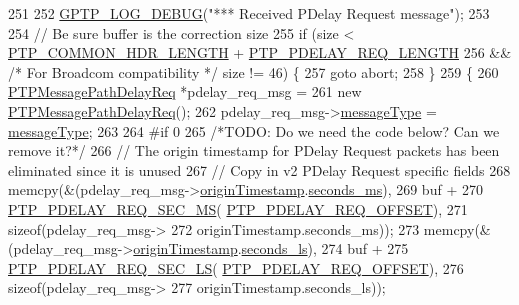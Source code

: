 \begin{DoxyCode}
{{{{{{251 
252         \hyperlink{gptp__log_8hpp_ae4c6efe7c9cf6d7d3bbd28a0fd087d61}{GPTP\_LOG\_DEBUG}(\textcolor{stringliteral}{"*** Received PDelay Request message"});
253 
254         \textcolor{comment}{// Be sure buffer is the correction size}
255         \textcolor{keywordflow}{if} (size < \hyperlink{avbts__message_8hpp_a8ec4d965b7b1e83844f1c17f12e9b8e4}{PTP\_COMMON\_HDR\_LENGTH} + 
      \hyperlink{avbts__message_8hpp_a7116d339377bcb1fbb2f4276aa9b3f70}{PTP\_PDELAY\_REQ\_LENGTH}
256             && \textcolor{comment}{/* For Broadcom compatibility */} size != 46) \{
257             \textcolor{keywordflow}{goto} abort;
258         \}
259         \{
260             \hyperlink{class_p_t_p_message_path_delay_req}{PTPMessagePathDelayReq} *pdelay\_req\_msg =
261                 \textcolor{keyword}{new} \hyperlink{class_p_t_p_message_path_delay_req}{PTPMessagePathDelayReq}();
262             pdelay\_req\_msg->\hyperlink{class_p_t_p_message_common_adb32627aa5b0e2dbad3ccd88aab07c05}{messageType} = \hyperlink{class_p_t_p_message_common_adb32627aa5b0e2dbad3ccd88aab07c05}{messageType};
263 
264 \textcolor{preprocessor}{#if 0}
265             \textcolor{comment}{/*TODO: Do we need the code below? Can we remove it?*/}
266             \textcolor{comment}{// The origin timestamp for PDelay Request packets has been eliminated since it is unused}
267             \textcolor{comment}{// Copy in v2 PDelay Request specific fields}
268             memcpy(&(pdelay\_req\_msg->\hyperlink{class_p_t_p_message_path_delay_req_a57a4bfcce938833de582c2ed5138aa3b}{originTimestamp}.\hyperlink{class_timestamp_a5d98378d782519e6f9c17db70f1620f0}{seconds\_ms}),
269                    buf +
270                    \hyperlink{avbts__message_8hpp_a6bca65c57b0e9a4c479d03f73fd91c02}{PTP\_PDELAY\_REQ\_SEC\_MS}(
      \hyperlink{avbts__message_8hpp_a11afdce162945d7ec2f0083eecbd53bd}{PTP\_PDELAY\_REQ\_OFFSET}),
271                    \textcolor{keyword}{sizeof}(pdelay\_req\_msg->
272                       originTimestamp.seconds\_ms));
273             memcpy(&(pdelay\_req\_msg->\hyperlink{class_p_t_p_message_path_delay_req_a57a4bfcce938833de582c2ed5138aa3b}{originTimestamp}.\hyperlink{class_timestamp_a2bf200e58cd268d8b86cf93c51500a44}{seconds\_ls}),
274                    buf +
275                    \hyperlink{avbts__message_8hpp_abc2070b7298e07fa08e983ea488237e4}{PTP\_PDELAY\_REQ\_SEC\_LS}(
      \hyperlink{avbts__message_8hpp_a11afdce162945d7ec2f0083eecbd53bd}{PTP\_PDELAY\_REQ\_OFFSET}),
276                    \textcolor{keyword}{sizeof}(pdelay\_req\_msg->
277                       originTimestamp.seconds\_ls));
}}}}}}
\end{DoxyCode}
